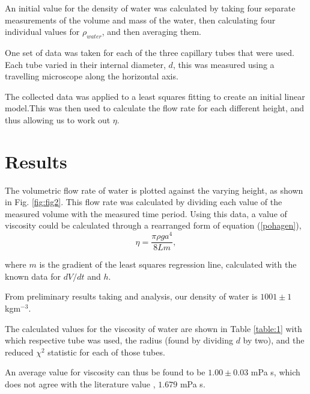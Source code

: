 \documentclass[twocolumn]{revtex4}
\newcommand{\squeezeup}{\vspace{-2.5mm}}
\begin{document}
\squeezeup
\squeezeup

An initial value for the density of water was calculated by taking four separate measurements of the volume and mass of the water, then calculating four individual values for $\rho_{water}$, and then averaging them.

One set of data was taken for each of the three capillary tubes that were used. Each tube varied in their internal diameter, $d$, this was measured using a travelling microscope along the horizontal axis. 

The collected data was applied to a least squares fitting to create an initial linear model.This was then used to calculate the flow rate for each different height, and thus allowing us to work out $\eta$.

\vspace{-3ex}
\section{Results}
\vspace{-2ex}

The volumetric flow rate of water is plotted against the varying height, as shown in Fig. \ref{fig:fig2}. This flow rate was calculated by dividing each value of the measured volume with the measured time period. Using this data, a value of viscosity could be calculated through a rearranged form of equation (\ref{pohagen}),
\squeezeup
\begin{equation} 
\eta=\frac{\pi \rho g a^4 }{8 L m}, 
\label{r-pohagen}
\end{equation}

where $m$ is the gradient of the least squares regression line, calculated with the known data for $dV/dt$ and $h$.

From preliminary results taking and analysis, our density of water is ${1001 \pm 1}$ kgm$^{-3}$.

The calculated values for the viscosity of water are shown in Table \ref{table:1} with which respective tube was used, the radius (found by dividing $d$ by two), and the reduced $\chi^2$ statistic for each of those tubes. 

An average value for viscosity can thus be found to be $1.00 \pm 0.03$ mPa s, which does not agree with the literature value \cite{crc}, $1.679$  mPa {s}. 
\end{document}
